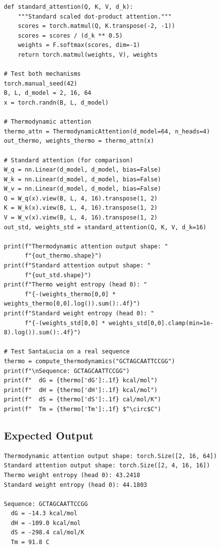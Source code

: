 \begin{lstlisting}[style=dogmapython, caption={Lab 5: Comparing thermodynamic vs.\ standard attention.}]
def standard_attention(Q, K, V, d_k):
    """Standard scaled dot-product attention."""
    scores = torch.matmul(Q, K.transpose(-2, -1))
    scores = scores / (d_k ** 0.5)
    weights = F.softmax(scores, dim=-1)
    return torch.matmul(weights, V), weights

# Test both mechanisms
torch.manual_seed(42)
B, L, d_model = 2, 16, 64
x = torch.randn(B, L, d_model)

# Thermodynamic attention
thermo_attn = ThermodynamicAttention(d_model=64, n_heads=4)
out_thermo, weights_thermo = thermo_attn(x)

# Standard attention (for comparison)
W_q = nn.Linear(d_model, d_model, bias=False)
W_k = nn.Linear(d_model, d_model, bias=False)
W_v = nn.Linear(d_model, d_model, bias=False)
Q = W_q(x).view(B, L, 4, 16).transpose(1, 2)
K = W_k(x).view(B, L, 4, 16).transpose(1, 2)
V = W_v(x).view(B, L, 4, 16).transpose(1, 2)
out_std, weights_std = standard_attention(Q, K, V, d_k=16)

print(f"Thermodynamic attention output shape: "
      f"{out_thermo.shape}")
print(f"Standard attention output shape: "
      f"{out_std.shape}")
print(f"Thermo weight entropy (head 0): "
      f"{-(weights_thermo[0,0] * weights_thermo[0,0].log()).sum():.4f}")
print(f"Standard weight entropy (head 0): "
      f"{-(weights_std[0,0] * weights_std[0,0].clamp(min=1e-8).log()).sum():.4f}")

# Test SantaLucia on a real sequence
thermo = compute_thermodynamics("GCTAGCAATTCCGG")
print(f"\nSequence: GCTAGCAATTCCGG")
print(f"  dG = {thermo['dG']:.1f} kcal/mol")
print(f"  dH = {thermo['dH']:.1f} kcal/mol")
print(f"  dS = {thermo['dS']:.1f} cal/mol/K")
print(f"  Tm = {thermo['Tm']:.1f} $^\circ$C")
\end{lstlisting}

\subsection{Expected Output}

\begin{lstlisting}[style=dogmapython, caption={Lab 5: Expected output.}, numbers=none]
Thermodynamic attention output shape: torch.Size([2, 16, 64])
Standard attention output shape: torch.Size([2, 4, 16, 16])
Thermo weight entropy (head 0): 43.2418
Standard weight entropy (head 0): 44.1803

Sequence: GCTAGCAATTCCGG
  dG = -14.3 kcal/mol
  dH = -109.0 kcal/mol
  dS = -298.4 cal/mol/K
  Tm = 91.8 C
\end{lstlisting}

